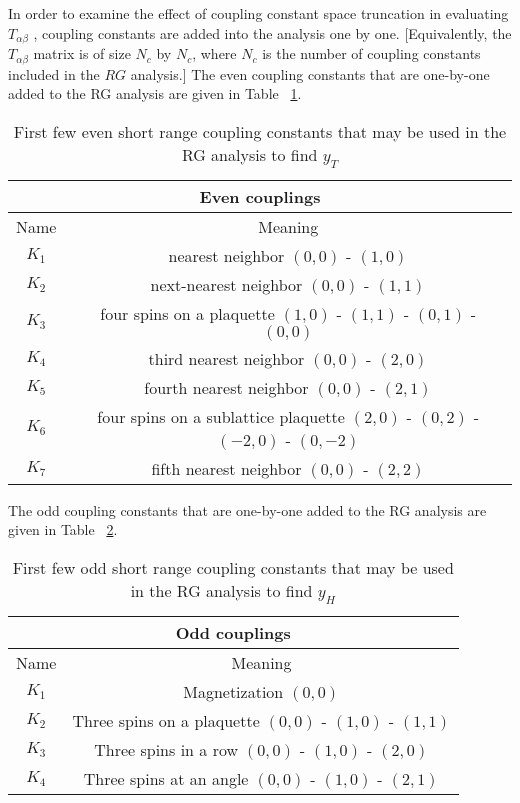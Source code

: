 \documentclass{article}
\begin{document}
In order to examine the effect of coupling constant space truncation in evaluating $T_{\alpha\beta}$ , coupling constants are added into the analysis one by one. [Equivalently, the $T_{\alpha\beta}$ matrix is of size $N_c$ by $N_c$, where $N_c$ is the number of coupling constants included in the $RG$ analysis.] The even coupling constants that are one-by-one added to the RG analysis are given in Table ~\ref{even}. 

\begin{table}[H]
\centering
\begin{tabular}{|c |c|} 
 \hline
\multicolumn{2}{|c|}{Even couplings} \\ 
 \hline
 Name & Meaning\\
 \hline
 $K_1$ & nearest neighbor $(0,0)$ - $(1,0)$\\
 $K_2$ & next-nearest neighbor $(0,0)$ - $(1,1)$\\
 $K_3$ & four spins on a plaquette $(1,0)$ - $(1,1)$ - $(0,1)$ - $(0,0)$\\
 $K_4$ & third nearest neighbor $(0,0)$ - $(2,0)$\\
 $K_5$ & fourth nearest neighbor $(0,0)$ - $(2,1)$\\
 $K_6$ & four spins on a sublattice plaquette $(2,0)$ - $(0,2)$ - $(-2,0)$ - $(0,-2)$\\
 $K_7$ & fifth nearest neighbor $(0,0)$ - $(2,2)$\\
 \hline
 \end{tabular}
 \caption{\label{even}First few even short range coupling constants that may be used in the RG analysis to find $y_T$}
\end{table}

The odd coupling constants that are one-by-one added to the RG analysis are given in Table ~\ref{odd}. 

\begin{table}[H]
\centering
\begin{tabular}{|c |c|} 
 \hline
\multicolumn{2}{|c|}{Odd couplings} \\ 
 \hline
 Name & Meaning\\
 \hline
 $K_1$ & Magnetization $(0,0)$\\
 $K_2$ & Three spins on a plaquette $(0,0)$ - $(1,0)$ - $(1,1)$\\
 $K_3$ & Three spins in a row $(0,0)$ - $(1,0)$ - $(2,0)$\\
 $K_4$ & Three spins at an angle $(0,0)$ - $(1,0)$ - $(2,1)$\\
 \hline
 \end{tabular}
 \caption{\label{odd}First few odd short range coupling constants that may be used in the RG analysis to find $y_H$}
\end{table}
\end{document}
